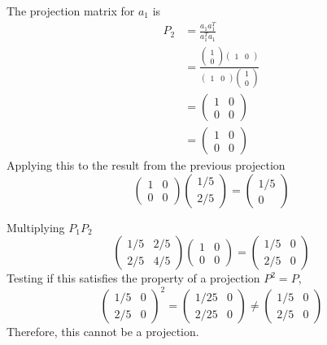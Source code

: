 \documentclass{article}
\begin{document}
The projection matrix for $a_1$ is 
\begin{align*}
    P_2 &= \frac{a_1 a_1^T}{a_1^T a_1} \\
    &= \frac{\begin{pmatrix} 1 \\ 0 \end{pmatrix} \begin{pmatrix} 1 & 0 \end{pmatrix}}{\begin{pmatrix} 1 & 0 \end{pmatrix} \begin{pmatrix} 1 \\ 0 \end{pmatrix}} \\
    &= \begin{pmatrix} 1 & 0 \\ 0 & 0 \end{pmatrix} \\
    &= \begin{pmatrix}
        1 & 0 \\
        0 & 0
    \end{pmatrix}
\end{align*}
Applying this to the result from the previous projection
$$ \begin{pmatrix}
    1 & 0 \\
    0 & 0
\end{pmatrix} \begin{pmatrix}
    1/5 \\
    2/5
\end{pmatrix} = \begin{pmatrix}
    1/5 \\
    0
\end{pmatrix} $$

Multiplying $P_1 P_2$
$$ \begin{pmatrix}
    1/5 & 2/5 \\
    2/5 & 4/5
\end{pmatrix} \begin{pmatrix}
    1 & 0 \\
    0 & 0
\end{pmatrix} = \begin{pmatrix}
    1/5 & 0 \\
    2/5 & 0
\end{pmatrix} $$
Testing if this satisfies the property of a projection $P^2 = P$,
$$ \begin{pmatrix}
    1/5 & 0 \\
    2/5 & 0
\end{pmatrix}^2 = \begin{pmatrix}
    1/25 & 0 \\
    2/25 & 0
\end{pmatrix} \neq \begin{pmatrix}
    1/5 & 0 \\
    2/5 & 0
\end{pmatrix} $$
Therefore, this cannot be a projection.
\end{document}

